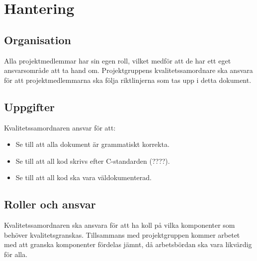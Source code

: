 \section{Hantering}

\subsection{Organisation}
Alla projektmedlemmar har sin egen roll, vilket medför att de har ett eget ansvarsområde att ta hand om. Projektgruppens kvalitetssamordnare ska ansvara för att projektmedlemmarna ska följa riktlinjerna som tas upp i detta dokument.

\subsection{Uppgifter}
Kvalitetssamordnaren ansvar för att:
\begin{itemize}
\item Se till att alla dokument är grammatiskt korrekta. 
\item Se till att all kod skrivs efter C-standarden (????).
\item Se till att all kod ska vara väldokumenterad.
\end{itemize}

\subsection{Roller och ansvar}
Kvalitetssamordnaren ska ansvara för att ha koll på vilka komponenter som behöver kvalitetsgranskas. Tillsammans med projektgruppen kommer arbetet med att granska komponenter fördelas jämnt, då arbetsbördan ska vara likvärdig för alla.




